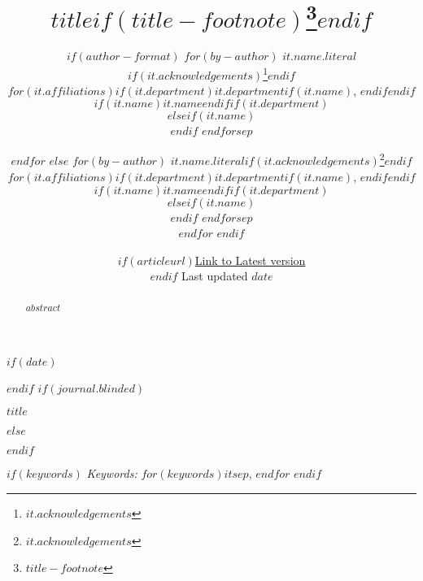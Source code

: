 \def\spacingset#1{\renewcommand{\baselinestretch}%
{#1}\small\normalsize} \spacingset{1}



$if(date)$
\date{$if(articleurl)$\href{$articleurl$}{Link to Latest version}\\ \vspace{1em} $endif$ Last updated $date$}
$endif$
$if(journal.blinded)$
\spacingset{.8}
\bigskip
\bigskip
\bigskip
\begin{center}
  {\LARGE $title$}
\end{center}
\smallskip
\bigskip
\spacingset{1}
$else$
\title{$title$$if(title-footnote)$\thanks{$title-footnote$}$endif$}
\author{
$if(author-format)$
$for(by-author)$
$it.name.literal$$if(it.acknowledgements)$\thanks{$it.acknowledgements$}$endif$\\
$for(it.affiliations)$$if(it.department)$$it.department$$if(it.name)$, $endif$$endif$$if(it.name)$$it.name$$endif$$if(it.department)$\\$elseif(it.name)$\\$endif$
$endfor$$sep$\and $endfor$
$else$
$for(by-author)$
$it.name.literal$$if(it.acknowledgements)$\thanks{$it.acknowledgements$}$endif$\\
$for(it.affiliations)$$if(it.department)$$it.department$$if(it.name)$, $endif$$endif$$if(it.name)$$it.name$$endif$$if(it.department)$\\$elseif(it.name)$\\$endif$
$endfor$$sep$\\$endfor$
$endif$}
\maketitle
$endif$

\bigskip
\bigskip
\begin{abstract}
$abstract$
\end{abstract}

\bigskip
$if(keywords)$
\noindent%
{\it Keywords:} $for(keywords)$$it$$sep$, $endfor$
\vfill
$endif$

\newpage
\spacingset{1.2} %
